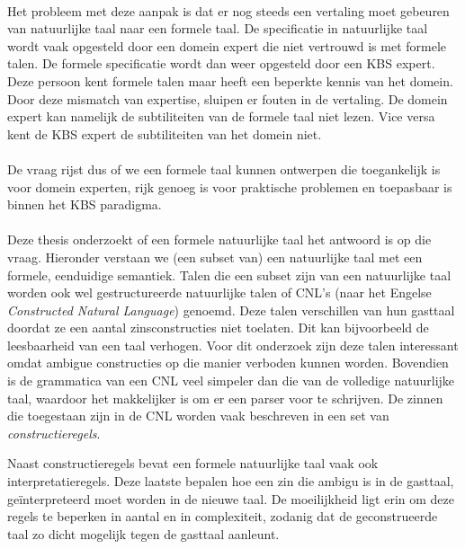\paragraph{} Het probleem met deze aanpak is dat er nog steeds een vertaling moet gebeuren van natuurlijke taal naar een formele taal. De specificatie in natuurlijke taal wordt vaak opgesteld door een domein expert die niet vertrouwd is met formele talen. De formele specificatie wordt dan weer opgesteld door een KBS expert. Deze persoon kent formele talen maar heeft een beperkte kennis van het domein. Door deze mismatch van expertise, sluipen er fouten in de vertaling. De domein expert kan namelijk de subtiliteiten van de formele taal niet lezen. Vice versa kent de KBS expert de subtiliteiten van het domein niet.

\paragraph{} De vraag rijst dus of we een formele taal kunnen ontwerpen die toegankelijk is voor domein experten, rijk genoeg is voor praktische problemen en toepasbaar is binnen het KBS paradigma.

\paragraph{} Deze thesis onderzoekt of een formele natuurlijke taal het antwoord is op die vraag. Hieronder verstaan we (een subset van) een natuurlijke taal met een formele, eenduidige semantiek. Talen die een subset zijn van een natuurlijke taal worden ook wel gestructureerde natuurlijke talen of CNL's (naar het Engelse \textit{Constructed Natural Language}) genoemd. Deze talen verschillen van hun gasttaal doordat ze een aantal zinsconstructies niet toelaten. Dit kan bijvoorbeeld de leesbaarheid van een taal verhogen. Voor dit onderzoek zijn deze talen interessant omdat ambigue constructies op die manier verboden kunnen worden. Bovendien is de grammatica van een CNL veel simpeler dan die van de volledige natuurlijke taal, waardoor het makkelijker is om er een parser voor te schrijven. De zinnen die toegestaan zijn in de CNL worden vaak beschreven in een set van \textit{constructieregels}.

Naast constructieregels bevat een formele natuurlijke taal vaak ook interpretatieregels. Deze laatste bepalen hoe een zin die ambigu is in de gasttaal, ge\"interpreteerd moet worden in de nieuwe taal. De moeilijkheid ligt erin om deze regels te beperken in aantal en in complexiteit, zodanig dat de geconstrueerde taal zo dicht mogelijk tegen de gasttaal aanleunt.

